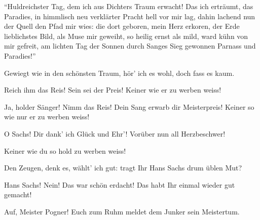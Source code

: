 \begin{drama}
\Waltherspeaks


``Huldreichster Tag,
dem ich aus Dichters Traum erwacht!
Das ich erträumt, das Paradies,
in himmlisch neu verklärter Pracht
hell vor mir lag,
dahin lachend nun der Quell den Pfad mir wies:
die dort geboren, mein Herz erkoren,
der Erde lieblichstes Bild,
als Muse mir geweiht,
so heilig ernst als mild,
ward kühn von mir gefreit,
am lichten Tag der Sonnen
durch Sanges Sieg gewonnen
Parnass und Paradies!''


Gewiegt wie in den schönsten Traum,
hör' ich es wohl, doch fass es kaum.


Reich ihm das Reis! Sein sei der Preis!
Keiner wie er zu werben weiss!


Ja, holder Sänger!
Nimm das Reis!
Dein Sang erwarb dir Meisterpreis!
Keiner so wie nur er zu werben weiss!

\Pognerspeaks


O Sachs! Dir dank' ich Glück und Ehr'!
Vorüber nun all Herzbeschwer!


\Evaspeaks


Keiner wie du so hold zu werben weiss!

\Sachsspeaks


Den Zeugen, denk es, wählt' ich gut:
tragt Ihr Hans Sachs drum üblen Mut?


Hans Sachs! Nein! Das war schön erdacht!
Das habt Ihr einmal wieder gut gemacht!


Auf, Meister Pogner! Euch zum Ruhm
meldet dem Junker sein Meistertum.

\Pognerspeaks
{}


\end{drama}

